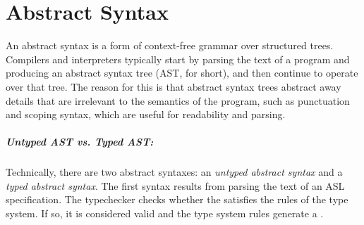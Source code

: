 \chapter{Abstract Syntax\label{chap:AbstractSyntax}}
An abstract syntax is a form of context-free grammar over structured trees.
Compilers and interpreters typically start by parsing the text of a program and producing an abstract syntax tree (AST, for short),
and then continue to operate over that tree.
%
The reason for this is that abstract syntax trees abstract away details that are irrelevant to the semantics of the program,
such as punctuation and scoping syntax, which are useful for readability and parsing.

\hypertarget{def-typedast}{}
\hypertarget{def-untypedast}{}
\paragraph{Untyped AST vs. Typed AST:}
Technically, there are two abstract syntaxes:
an \emph{untyped abstract syntax} and a \emph{typed abstract syntax}.
The first syntax results from parsing the text of an ASL specification.
The typechecker checks whether the \untypedast{} satisfies the rules of the
type system. If so, it is considered valid and the type system rules
generate a \typedast.


